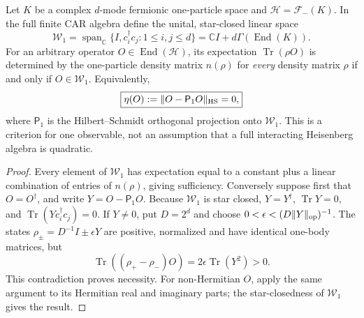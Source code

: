 \documentclass[12pt,a4paper]{article}
\begin{document}
\begin{theorem}
\label{p4b:thm:v347-onebody-criterion}
Let \(K\) be a complex \(d\)-mode fermionic one-particle space and
\(\mathscr H=\mathcal F_-(K)\).  In the full finite CAR algebra define the
unital, star-closed linear space
\[
 \mathscr W_1=\operatorname{span}_{\mathbb C}
 \{I,c_i^\dagger c_j:1\le i,j\le d\}
 =\mathbb CI+d\Gamma(\operatorname{End}(K)).
\]
For an arbitrary operator \(O\in\operatorname{End}(\mathscr H)\), its
expectation \(\operatorname{Tr}(\rho O)\) is determined by the
one-particle density matrix \(n(\rho)\) for \emph{every} density matrix
\(\rho\) if and only if \(O\in\mathscr W_1\).  Equivalently,
\begin{equation}\label{p4b:eq:v347-onebody-defect}
 \boxed{\eta(O):=\|O-\mathsf P_1O\|_{\rm HS}=0,}
\end{equation}
where \(\mathsf P_1\) is the Hilbert--Schmidt orthogonal projection onto
\(\mathscr W_1\).  This is a criterion for one observable, not an
assumption that a full interacting Heisenberg algebra is quadratic.
\end{theorem}
\begin{proof}
Every element of \(\mathscr W_1\) has expectation equal to a
constant plus a linear combination of entries of \(n(\rho)\), giving
sufficiency.  Conversely suppose first that \(O=O^\dagger\), and write
\(Y=O-\mathsf P_1O\).  Because \(\mathscr W_1\) is star closed,
\(Y=Y^\dagger\), \(\operatorname{Tr}Y=0\), and
\(\operatorname{Tr}(Yc_i^\dagger c_j)=0\).  If \(Y\ne0\), put
\(D=2^d\) and choose
\(0<\epsilon<(D\|Y\|_{\rm op})^{-1}\).  The states
\(\rho_\pm=D^{-1}I\pm\epsilon Y\) are positive, normalized and have
identical one-body matrices, but
\[
 \operatorname{Tr}((\rho_+-\rho_-)O)
 =2\epsilon\operatorname{Tr}(Y^2)>0.
\]
This contradiction proves necessity.  For non-Hermitian \(O\), apply
the same argument to its Hermitian real and imaginary parts; the
star-closedness of \(\mathscr W_1\) gives the result.
\end{proof}
\end{document}
